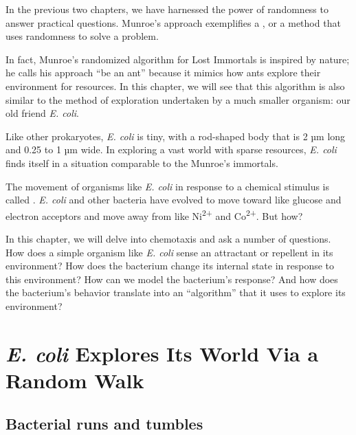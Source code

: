 In the previous two chapters, we have harnessed the power of randomness to answer practical questions. Munroe's approach exemplifies a , or a method that uses randomness to solve a problem.

In fact, Munroe's randomized algorithm for Lost Immortals is inspired by nature; he calls his approach ``be an ant'' because it mimics how ants explore their environment for resources. In this chapter, we will see that this algorithm is also similar to the method of exploration undertaken by a much smaller organism: our old friend \textit{E. coli}.

Like other prokaryotes, \textit{E. coli} is tiny, with a rod-shaped body that is 2 µm long and 0.25 to 1 µm wide. In exploring a vast world with sparse resources, \textit{E. coli} finds itself in a situation comparable to the Munroe's immortals.

%

The movement of organisms like \textit{E. coli} in response to a chemical stimulus is called . \textit{E. coli} and other bacteria have evolved to move toward  like glucose and electron acceptors and move away from  like Ni\textsuperscript{2+} and Co\textsuperscript{2+}. But how?

In this chapter, we will delve into chemotaxis and ask a number of questions. How does a simple organism like \textit{E. coli} sense an attractant or repellent in its environment? How does the bacterium change its internal state in response to this environment? How can we model the bacterium's response? And how does the bacterium's behavior translate into an ``algorithm'' that it uses to explore its environment?\\

\FloatBarrier
{}
\section{\textit{E. coli} Explores Its World Via a Random Walk}
\label{sec:e_coli_explores_its_world_via_a_random_walk}

\subsection{Bacterial runs and tumbles}


